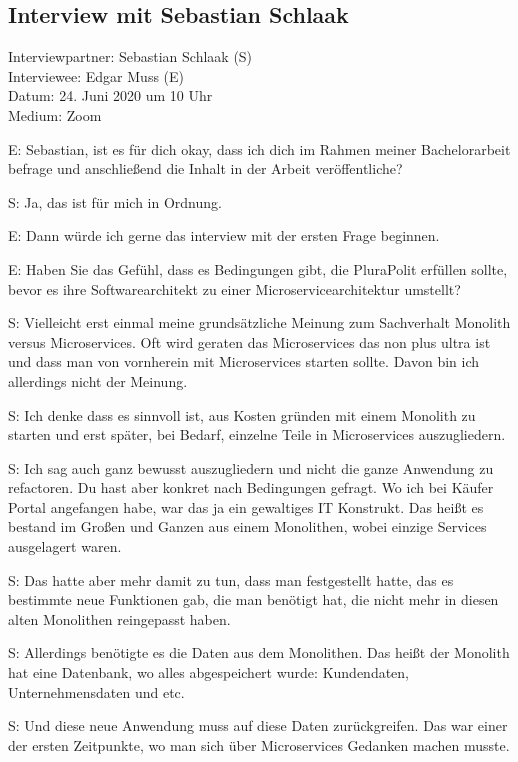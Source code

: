 
\subsection{Interview mit Sebastian Schlaak}
\label{appendix:schlaak}

Interviewpartner: Sebastian Schlaak (S) \\
Interviewee: Edgar Muss (E) \\
Datum: 24. Juni 2020 um 10 Uhr \\
Medium: Zoom

E: Sebastian, ist es für dich okay, dass ich dich im Rahmen meiner Bachelorarbeit befrage und anschließend die Inhalt in der Arbeit veröffentliche?

S: Ja, das ist für mich in Ordnung.

E: Dann würde ich gerne das interview mit der ersten Frage beginnen. 

E: Haben Sie das Gefühl, dass es Bedingungen gibt, die PluraPolit erfüllen sollte, bevor es ihre Softwarearchitekt zu einer Microservicearchitektur umstellt?

S: Vielleicht erst einmal meine grundsätzliche Meinung zum Sachverhalt Monolith versus Microservices. Oft wird geraten das Microservices das non plus ultra ist und dass man von vornherein mit Microservices starten sollte. Davon bin ich allerdings nicht der Meinung.

 \label{appendix:s-1}  \label{appendix:s-2}
S: Ich denke dass es sinnvoll ist, aus Kosten gründen mit einem Monolith zu starten und erst später, bei Bedarf, einzelne Teile in Microservices auszugliedern. 

S: Ich sag auch ganz bewusst auszugliedern und nicht die ganze Anwendung zu refactoren. Du hast aber konkret nach Bedingungen gefragt. Wo ich bei Käufer Portal angefangen habe, war das ja ein gewaltiges IT Konstrukt. Das heißt es bestand im Großen und Ganzen aus einem Monolithen, wobei einzige Services ausgelagert waren.

 \label{appendix:s-3}
S: Das hatte aber mehr damit zu tun, dass man festgestellt hatte, das es bestimmte neue Funktionen gab, die man benötigt hat, die nicht mehr in diesen alten Monolithen reingepasst haben. 

S: Allerdings benötigte es die Daten aus dem Monolithen. Das heißt der Monolith hat eine Datenbank, wo alles abgespeichert wurde: Kundendaten, Unternehmensdaten und etc.

 \label{appendix:s-4}
S: Und diese neue Anwendung muss auf diese Daten zurückgreifen. Das war einer der ersten Zeitpunkte, wo man sich über Microservices Gedanken machen musste.


